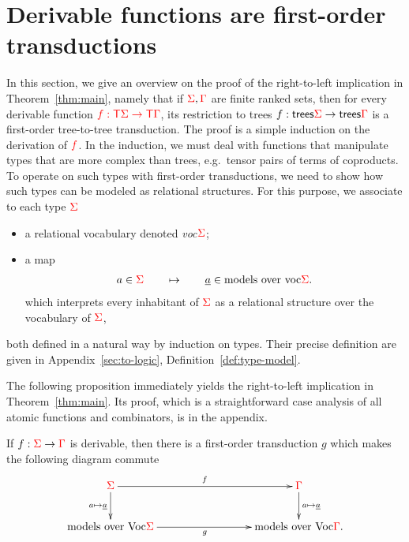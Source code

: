 \newcommand{\Root}[1]{\mathsf{root}_{#1}}
\newcommand{\Port}[1]{\mathsf{port}_{#1}}
\newcommand{\Interface}[1]{\mathsf{Interface}_{#1}}
\section{Derivable functions are first-order transductions}
\label{sec:to-transductions}
In this section, we give an overview on the proof of the right-to-left implication in Theorem~\ref{thm:main}, namely that if ${\color{red}{\Sigma}},{\color{red}{\Gamma}}$ are finite ranked sets, then for every derivable function ${\color{red}{f : {\color{red}{\mathsf T}}{\color{red}{\Sigma}}\to {\color{red}{\mathsf T}}{\color{red}{\Gamma}}}}$, its restriction to trees $f : \mathsf {trees} {\color{red}{\Sigma}} \to \mathsf {trees} {\color{red}{\Gamma}}$
is a first-order tree-to-tree transduction. The proof is a simple induction on the derivation of  ${\color{red}{f}}$. In the induction, we must deal with functions that manipulate types that are more complex than trees, e.g.~tensor pairs of terms of coproducts.  To operate on such types with first-order transductions, we need to show how such types can be modeled as relational structures. For this purpose, we associate to each type ${\color{red}{\Sigma}}$
\begin{itemize}
\item a relational vocabulary denoted  \emph{voc$ {\color{red}{\Sigma}}$};
\item a map 
 \begin{align*}
        a \in {\color{red}{\Sigma}} \qquad \mapsto \qquad \underline a \in \text{models over voc$ {\color{red}{\Sigma}}$}.
    \end{align*}
    which interprets every inhabitant of ${\color{red}{\Sigma}}$ as a relational structure over the vocabulary of ${\color{red}{\Sigma}}$,
\end{itemize}
both defined in a natural way by induction on types. Their precise definition are given in Appendix~\ref{sec:to-logic}, Definition~\ref{def:type-model}.
    \smallskip

The following proposition immediately yields the right-to-left implication in Theorem~\ref{thm:main}. Its proof, which is a straightforward case analysis of all atomic functions and combinators, is in the appendix. 


  
\begin{proposition}\label{prop:to-logic} If $f : {\color{red}{\Sigma}} \to {\color{red}{\Gamma}}$ is derivable, then there is a first-order transduction $g$ 
    which makes the following diagram commute
    \begin{align*}
        \xymatrix@C=3cm{
            \rSigma \ar[d]_{a \mapsto \underline a}\ar[r]^f &  \rGamma \ar[d]^{a \mapsto \underline a} \\
            \text{models over  Voc$\rSigma$} \ar[r]_g &  \text{models over Voc$ \rGamma$}.
        } 
    \end{align*}
\end{proposition}



